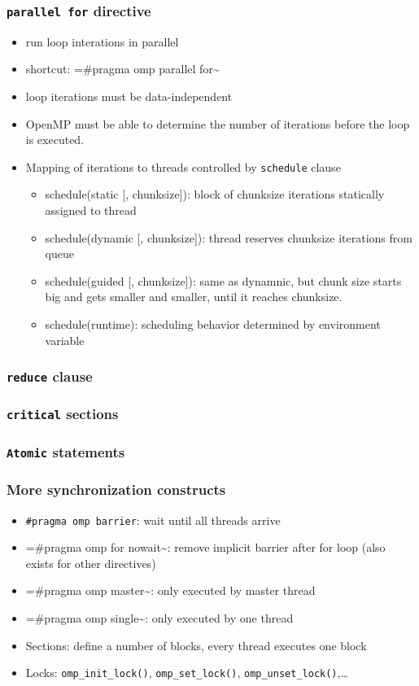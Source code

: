 \documentclass[11pt]{article}
\begin{document}
\subsubsection{\texttt{parallel for} directive}
\label{sec-2-2-4}
\begin{itemize}
\item run loop interations in parallel
\item shortcut: =\#pragma omp parallel for\textasciitilde{}
\item loop iterations must be data-independent
\item OpenMP must be able to determine the number of iterations before the loop is executed.
\item Mapping of iterations to threads controlled by \verb~schedule~ clause
\begin{itemize}
\item schedule(static [, chunksize]): block of chunksize iterations statically assigned to thread
\item schedule(dynamic [, chunksize]): thread reserves chunksize iterations from queue
\item schedule(guided [, chunksize]): same as dynamnic, but chunk size starts big and gets smaller and smaller, until it reaches chunksize.
\item schedule(runtime): scheduling behavior determined by environment variable
\end{itemize}
\end{itemize}
\subsubsection{\texttt{reduce} clause}
\label{sec-2-2-5}
\subsubsection{\texttt{critical} sections}
\label{sec-2-2-6}
\subsubsection{\texttt{Atomic} statements}
\label{sec-2-2-7}
\subsubsection{More synchronization constructs}
\label{sec-2-2-8}
\begin{itemize}
\item \texttt{\#pragma omp barrier}: wait until all threads arrive
\item =\#pragma omp for nowait\textasciitilde{}: remove implicit barrier after for loop (also exists for other directives)
\item =\#pragma omp master\textasciitilde{}: only executed by master thread
\item =\#pragma omp single\textasciitilde{}: only executed by one thread
\item Sections: define a number of blocks, every thread executes one block
\item Locks: \texttt{omp\_init\_lock()}, \texttt{omp\_set\_lock()}, \texttt{omp\_unset\_lock()},\ldots{}
\end{itemize}
\end{document}
